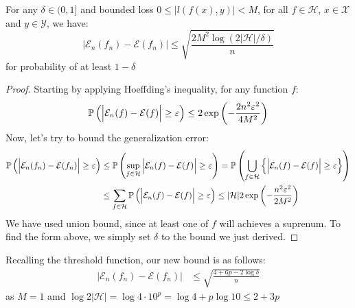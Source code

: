 \begin{theorem}
    \label{thm:gen-bound}
    For any $\delta\in(0, 1]$ and bounded loss $0\le|l(f(x), y)|<M$, for all $f\in \mathcal{H} $, $x\in\mathcal{X}$ and $y\in\mathcal{Y}$, we have:
    \begin{equation*}
        \Big| \mathcal{E}_n(f_n) - \mathcal{E}(f_n) \Big| \le \sqrt{\frac{2M^2\log(2|\mathcal{H}|/\delta)}{n}}
    \end{equation*}
    for probability of at least $1-\delta$
\end{theorem}
\begin{proof}
    Starting by applying Hoeffding's inequality, for any function $f$:
    \begin{equation*}
        \mathbb{P}\left( \Big| \mathcal{E}_n(f) - \mathcal{E}(f) \Big| \ge \varepsilon \right) \le 2\exp\left( -\frac{2n^2\varepsilon^2}{4M^2} \right)
    \end{equation*}    
    Now, let's try to bound the generalization error:
    \begin{equation*}
    \begin{aligned}
        \mathbb{P}\left( \Big| \mathcal{E}_n(f_n) - \mathcal{E}(f_n) \Big| \ge \varepsilon \right) &\le \mathbb{P}\left( \sup_{f\in\mathcal{H}}\Big| \mathcal{E}_n(f) - \mathcal{E}(f) \Big| \ge \varepsilon \right) = \mathbb{P}\left( \bigcup_{f\in\mathcal{H}} \left\{ \Big| \mathcal{E}_n(f) - \mathcal{E}(f) \Big| \ge \varepsilon \right\}  \right) \\
        &\le \sum_{f\in\mathcal{H}}\mathbb{P}\left( \Big| \mathcal{E}_n(f) - \mathcal{E}(f) \Big| \ge \varepsilon \right) \le |\mathcal{H}|2\exp\left( -\frac{n^2\varepsilon^2}{2M^2} \right)
    \end{aligned}
    \end{equation*}
    We have used union bound, since at least one of $f$ will achieves a suprenum. To find the form above, we simply set $\delta$ to the bound we just derived.
\end{proof}

\begin{remark}
    Recalling the threshold function, our new bound is as follows:
    \begin{equation*}
    \begin{aligned}
        \Big| \mathcal{E}_n(f_n) - \mathcal{E}(f_n) \Big| &\le \sqrt{\frac{4 + 6p-2\log\delta}{n}}
    \end{aligned}
    \end{equation*}
    as $M =1$ amd $\log2|\mathcal{H}| = \log 4\cdot10^p = \log 4 + p\log 10 \le 2+3p$
\end{remark}


